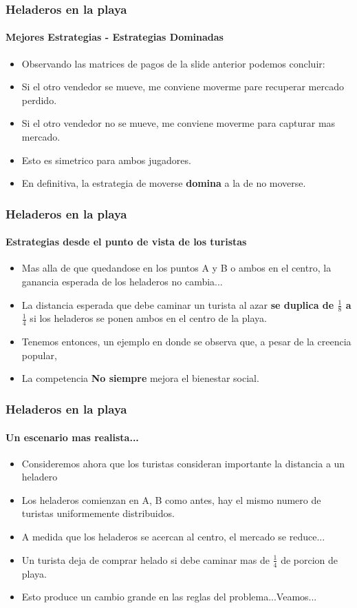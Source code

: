 \documentclass{beamer}
\begin{document}
\begin{frame}
  \frametitle{Heladeros en la playa}
  \framesubtitle{Mejores Estrategias - Estrategias Dominadas}
  \begin{itemize}
    \setlength{\itemsep}{4pt}
    \item Observando las matrices de pagos de la slide anterior podemos concluir:
    \pause    
    \item Si el otro vendedor se mueve, me conviene moverme pare recuperar mercado perdido.
    \pause
    \item Si el otro vendedor no se mueve, me conviene moverme para capturar mas mercado.
    \pause
    \item Esto es simetrico para ambos jugadores.
    \pause
    \item En definitiva, la estrategia de moverse \textbf{domina} a la de no moverse.
  \end{itemize}
\end{frame}

\begin{frame}
  \frametitle{Heladeros en la playa}
  \framesubtitle{Estrategias desde el punto de vista de los turistas}
  \begin{itemize}
    \setlength{\itemsep}{4pt}
    \item Mas alla de que quedandose en los puntos A y B o ambos en el centro, la ganancia esperada de los heladeros no cambia...
    \pause
    \item La distancia esperada que debe caminar un turista al azar \textbf{se duplica de $\frac{1}{8}$ a $\frac{1}{4}$} si los heladeros se ponen ambos en el centro de la playa.
    \pause
    \item Tenemos entonces, un ejemplo en donde se observa que, a pesar de la creencia popular,
    \item La competencia \textbf{No siempre} mejora el bienestar social. 
  \end{itemize}
\end{frame}

\begin{frame}
  \frametitle{Heladeros en la playa}
  \framesubtitle{Un escenario mas realista...}
  \begin{itemize}
    \setlength{\itemsep}{4pt}
    \item Consideremos ahora que los turistas consideran importante la distancia a un heladero
    \pause
    \item Los heladeros comienzan en A, B como antes, hay el mismo numero de turistas uniformemente distribuidos.
    \pause
    \item A medida que los heladeros se acercan al centro, el mercado se reduce...
    \pause
    \item Un turista deja de comprar helado si debe caminar mas de $\frac{1}{4}$ de porcion de playa.
    \pause
    \item Esto produce un cambio grande en las reglas del problema...Veamos...
  \end{itemize}
\end{frame}
\end{document}
